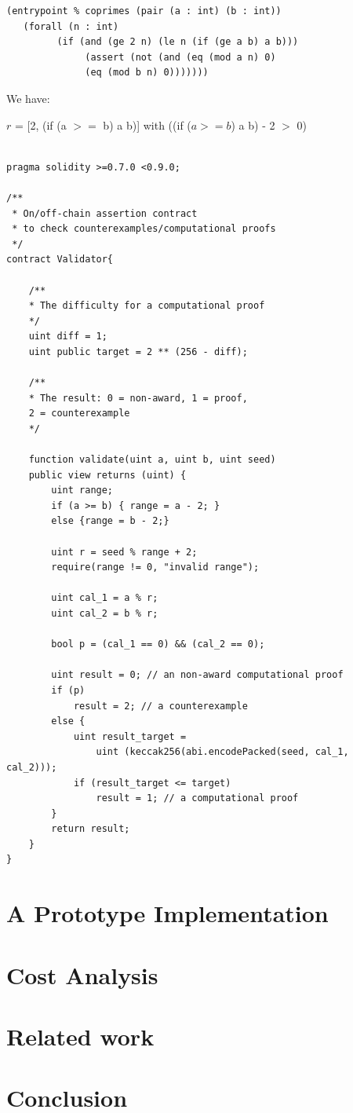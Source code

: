 \documentclass[runningheads]{llncs}
\begin{document}
\begin{lstlisting}[numbers=none]
(entrypoint % coprimes (pair (a : int) (b : int))
   (forall (n : int)
         (if (and (ge 2 n) (le n (if (ge a b) a b)))
              (assert (not (and (eq (mod a n) 0) 
              (eq (mod b n) 0)))))))
\end{lstlisting}


\noindent We have:

$r$ = [2, (if (a $>=$ b) a b)] with ((if ($a >= b$) a b) - 2 $>$ 0)


\begin{lstlisting}[numbers=none]

pragma solidity >=0.7.0 <0.9.0;

/**
 * On/off-chain assertion contract 
 * to check counterexamples/computational proofs
 */
contract Validator{

    /**
    * The difficulty for a computational proof
    */
    uint diff = 1;
    uint public target = 2 ** (256 - diff); 

    /**
    * The result: 0 = non-award, 1 = proof, 
    2 = counterexample
    */

    function validate(uint a, uint b, uint seed)
    public view returns (uint) {
        uint range;
        if (a >= b) { range = a - 2; }
        else {range = b - 2;}
        
        uint r = seed % range + 2;
        require(range != 0, "invalid range");

        uint cal_1 = a % r;
        uint cal_2 = b % r;
        
        bool p = (cal_1 == 0) && (cal_2 == 0);

        uint result = 0; // an non-award computational proof 
        if (p)  
            result = 2; // a counterexample
        else {
            uint result_target = 
                uint (keccak256(abi.encodePacked(seed, cal_1, cal_2)));
            if (result_target <= target) 
                result = 1; // a computational proof      
        }              
        return result;           
    }
}

\end{lstlisting}

\section{A Prototype Implementation}
\section{Cost Analysis}
\section{Related work}
\section{Conclusion}

\newpage
{}


\newpage


\end{document}
